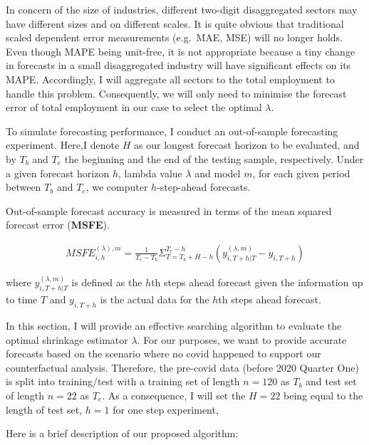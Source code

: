 \documentclass{monashthesis}
\begin{document}
In concern of the size of industries, different two-digit disaggregated sectors may have different sizes and on different scales. It is quite obvious that traditional scaled dependent error measurements (e.g.~MAE, MSE) will no longer holds. Even though MAPE being unit-free, it is not appropriate because a tiny change in forecasts in a small disaggregated industry will have significant effects on its MAPE. Accordingly, I will aggregate all sectors to the total employment to handle this problem. Consequently, we will only need to minimise the forecast error of total employment in our case to select the optimal \(\lambda\).

To simulate forecasting performance, I conduct an out-of-sample forecasting experiment. Here,I denote \(H\) as our longest forecast horizon to be evaluated, and by \(T_{b}\) and \(T_{e}\) the beginning and the end of the testing sample, respectively. Under a given forecast horizon \(h\), lambda value \(\lambda\) and model \(m\), for each given period between \(T_{b}\) and \(T_{e}\), we computer \(h\)-step-ahead forecasts.

Out-of-sample forecast accuracy is measured in terms of the mean squared forecast error (\textbf{MSFE}).

\[
\begin{aligned}
MSFE^{(\lambda),m}_{i,h}=\frac{1}{T_{e}-T_{b}}\Sigma^{T_{e}-h}_{T=T_{b}+H-h}({y}_{i,T+h|T}^{(\lambda,m)}-y_{i,T+h})
\end{aligned}
\]

where \({y}_{i,T+h|T}^{(\lambda,m)}\) is defined as the \(h\)th steps ahead forecast given the information up to time \(T\) and \(y_{i,T+h}\) is the actual data for the \(h\)th steps ahead forecast.

In this section, I will provide an effective searching algorithm to evaluate the optimal shrinkage estimator \(\lambda\). For our purposes, we want to provide accurate forecasts based on the scenario where no covid happened to support our counterfactual analysis. Therefore, the pre-covid data (before 2020 Quarter One) is split into training/test with a training set of length \(n=120\) as \(T_b\) and test set of length \(n=22\) as \(T_e\). As a consequence, I will set the \(H=22\) being equal to the length of test set, \(h=1\) for one step experiment,

Here is a brief description of our proposed algorithm:

\graphicspath{ {/Users/elvisyang/Desktop/hon_proj/Disaggregated_Employment/Honours_thesis/figures} }
\end{document}
